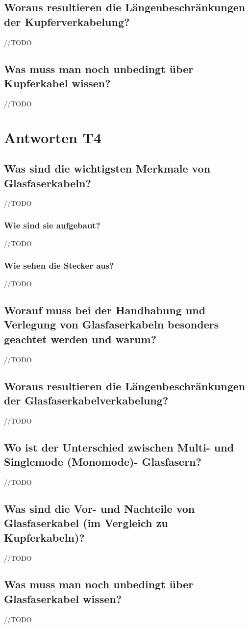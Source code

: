 \subsection*{Woraus resultieren die Längenbeschränkungen der Kupferverkabelung?}
//TODO
\subsection*{Was muss man noch unbedingt über Kupferkabel wissen?}
//TODO

\section{Antworten T4}
\subsection*{Was sind die wichtigsten Merkmale von Glasfaserkabeln?}
//TODO
\subsubsection*{Wie sind sie aufgebaut?}
//TODO
\subsubsection*{Wie sehen die Stecker aus?}
//TODO
\subsection*{Worauf muss bei der Handhabung und Verlegung von Glasfaserkabeln besonders geachtet werden und warum?}
//TODO
\subsection*{Woraus resultieren die Längenbeschränkungen der Glasfaserkabelverkabelung?}
//TODO
\subsection*{Wo ist der Unterschied zwischen Multi- und Singlemode (Monomode)- Glasfasern?}
//TODO
\subsection*{Was sind die Vor- und Nachteile von Glasfaserkabel (im Vergleich zu Kupferkabeln)?}
//TODO
\subsection*{Was muss man noch unbedingt über Glasfaserkabel wissen?}
//TODO

